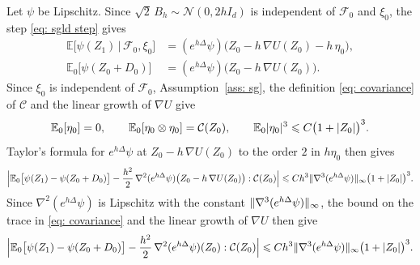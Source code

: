 Let $\psi$ be Lipschitz. Since $\sqrt2\, B_h \sim \mathcal N(0, 2h I_d)$ is independent of $\mathcal F_0$ and $\xi_0$, the step \eqref{eq: sgld step} gives
\begin{equation*}
\begin{aligned}
    \mathbb E\bigl[ \psi(Z_1) \,\big|\, \mathcal F_0, \xi_0 \bigr] & = ( e^{h\Delta} \psi )\bigl( Z_0 - h\, \nabla U(Z_0) - h\, \eta_0 \bigr) , \\
    \mathbb E_0\bigl[ \psi(Z_0 + D_0) \bigr] & = ( e^{h\Delta} \psi )\bigl( Z_0 - h\, \nabla U(Z_0) \bigr) .
\end{aligned}
\end{equation*}
Since $\xi_0$ is independent of $\mathcal F_0$, Assumption~\ref{ass: sg}, the definition \eqref{eq: covariance} of $\mathcal C$ and the linear growth of $\nabla U$ give
\begin{equation*}
    \mathbb E_0[\eta_0] = 0 , \qquad \mathbb E_0[\eta_0 \otimes \eta_0] = \mathcal C(Z_0) , \qquad \mathbb E_0 |\eta_0|^3 \leqslant C \bigl( 1 + |Z_0| \bigr)^3 .
\end{equation*}
Taylor's formula for $e^{h\Delta} \psi$ at $Z_0 - h\, \nabla U(Z_0)$ to the order $2$ in $h\eta_0$ then gives
\begin{equation*}
    \Bigl| \mathbb E_0\bigl[ \psi(Z_1) - \psi(Z_0 + D_0) \bigr] - \frac{h^2}{2}\, \nabla^2 ( e^{h\Delta} \psi )\bigl( Z_0 - h\, \nabla U(Z_0) \bigr) : \mathcal C(Z_0) \Bigr| \leqslant C h^3 \lVert \nabla^3 ( e^{h\Delta} \psi ) \rVert_\infty \bigl( 1 + |Z_0| \bigr)^3 .
\end{equation*}
Since $\nabla^2 ( e^{h\Delta} \psi )$ is Lipschitz with the constant $\lVert \nabla^3 ( e^{h\Delta} \psi ) \rVert_\infty$, the bound on the trace in \eqref{eq: covariance} and the linear growth of $\nabla U$ then give
\begin{equation}
    \Bigl| \mathbb E_0\bigl[ \psi(Z_1) - \psi(Z_0 + D_0) \bigr] - \frac{h^2}{2}\, \nabla^2 ( e^{h\Delta} \psi )(Z_0) : \mathcal C(Z_0) \Bigr| \leqslant C h^3 \lVert \nabla^3 ( e^{h\Delta} \psi ) \rVert_\infty \bigl( 1 + |Z_0| \bigr)^3 .
    \label{eq: sgld noise}
\end{equation}

